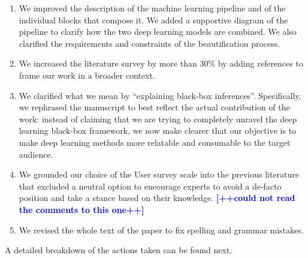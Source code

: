 \documentclass{paper}
\begin{document}
\begin{enumerate}


\item We improved the description of the machine learning pipeline and of the individual blocks that compose it. We added a supportive diagram of the pipeline to clarify how the two deep learning models are combined. 
We also clarified the requirements and constraints of the beautification process.

\item We increased the literature survey by more than 30\% by adding references to frame our work in a broader context. 

\item We clarified what we mean by ``explaining black-box inferences''. Specifically, we rephrased the manuscript to best reflect the actual contribution of the work: instead of claiming that we are trying to completely unravel the deep learning black-box framework, we now make clearer that our objective is to make deep learning methods more relatable and consumable to the target audience.

\item We grounded our choice of the User survey scale into the previous literature that excluded a neutral option to encourage experts to avoid a de-facto position and take a stance based on their knowledge. \textcolor{blue}{\textbf{[++could not read the comments to this one++]}}

\item We revised the whole text of the paper to fix spelling and grammar mistakes.

\end{enumerate}

A detailed breakdown of the actions taken can be found next.
\end{document}

